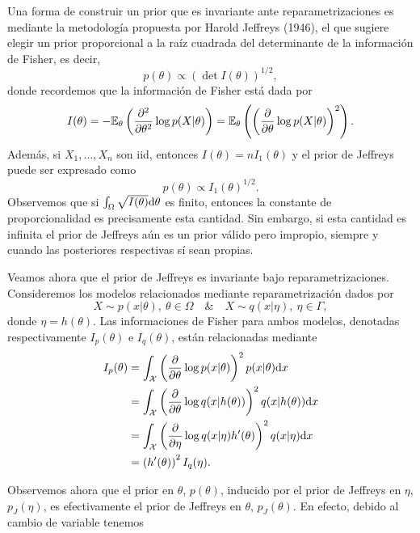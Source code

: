 Una forma de construir un prior que es invariante ante reparametrizaciones es mediante la metodología propuesta por  Harold Jeffreys (1946), el que sugiere elegir un prior proporcional a la raíz cuadrada del determinante de la información de Fisher, es decir,  
\begin{equation}
	p(\theta) \propto \left( \det I(\theta)\right)^{1/2},
\end{equation}
donde recordemos que la información de Fisher está dada por 
\begin{equation}
	I(\theta) = -\mathbb{E}_\theta \left(\frac{\partial^2}{\partial\theta^2}\log p(X|\theta)\right) = \mathbb{E}_\theta \left(\left(\frac{\partial}{\partial\theta}\log p(X|\theta)\right)^2\right).
\end{equation}
Además, si $X_1,\ldots,X_n$ son iid, entonces $I(\theta) = n I_1(\theta)$ y el prior de Jeffreys puede ser expresado como 
\begin{equation}
	p(\theta) \propto  I_1(\theta)^{1/2}.
\end{equation}
Observemos que si $\int_\Omega\sqrt{I(\theta)}{\text{d}}\theta$ es finito, entonces la constante de proporcionalidad es precisamente esta cantidad. Sin embargo, si esta cantidad es infinita el prior de Jeffreys aún es un prior válido pero impropio, siempre y cuando las posteriores respectivas sí sean propias. 

Veamos ahora que el prior de Jeffreys es invariante bajo reparametrizaciones. Consideremos los modelos relacionados mediante reparametrización dados por 
\begin{equation}
	X\sim p(x|\theta),\ \theta\in\Omega\quad \& \quad X\sim q(x|\eta),\ \eta\in\Gamma,
\end{equation}
donde $\eta = h(\theta)$. Las informaciones de Fisher para ambos modelos, denotadas respectivamente $I_p(\theta)$ e $I_q(\theta)$, están relacionadas mediante
\begin{align}
	I_p(\theta) &= \int_{\mathcal X}\left(\frac{\partial}{\partial\theta}\log p(x|\theta)\right)^2p(x|\theta){\text{d}} x\nonumber\\
				&= \int_{\mathcal X}\left(\frac{\partial}{\partial\theta}\log q(x|h(\theta))\right)^2q(x|h(\theta)){\text{d}} x\nonumber\\
				&= \int_{\mathcal X}\left(\frac{\partial}{\partial\eta}\log q(x|\eta) h'(\theta)\right)^2q(x|\eta){\text{d}} x\nonumber\\
				&= \left(h'(\theta)\right)^2 I_q(\eta).
\end{align} 

Observemos ahora que el prior en $\theta$, $p(\theta)$, inducido por el prior de Jeffreys en $\eta$, $p_J(\eta)$, es efectivamente el prior de Jeffreys en $\theta$, $p_J(\theta)$. En efecto, debido al cambio de variable tenemos

